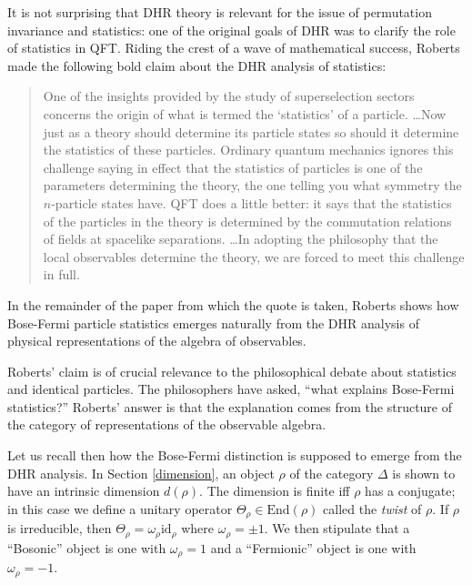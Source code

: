 \documentclass[11pt]{article}
\theoremstyle{definition}
\theoremstyle{definition}
\theoremstyle{remark}
\def\om{\omega} \def\Om{\Omega} \def\dd{\partial} \def\D{\Delta}
\newcommand{\End}{\mathrm{End}}
\def\id{\mathrm{id}}
\begin{document}
It is not surprising that DHR theory is relevant for the issue of
permutation invariance and statistics: one of the original goals of
DHR was to clarify the role of statistics in QFT.  Riding the crest of
a wave of mathematical success, Roberts made the following bold claim
about the DHR analysis of statistics:
\begin{quote}
  One of the insights provided by the study of
  superselection sectors concerns the origin of what is
  termed the `statistics' of a particle. \dots Now just
  as a theory should determine its particle states so
  should it determine the statistics of these
  particles.  Ordinary quantum mechanics ignores this
  challenge saying in effect that the statistics of
  particles is one of the parameters determining the
  theory, the one telling you what symmetry the
  $n$-particle states have.  QFT does a little better:
  it says that the statistics of the particles in the
  theory is determined by the commutation relations of
  fields at spacelike separations.  \ldots In adopting
  the philosophy that the local observables determine
  the theory, we are forced to meet this challenge in
  full.  \cite[p.\ 203]{rob-stat}
\end{quote} In the remainder of the paper from which the quote is
taken, Roberts shows how Bose-Fermi particle statistics emerges
naturally from the DHR analysis of physical representations of the
algebra of observables.

Roberts' claim is of crucial relevance to the philosophical debate
about statistics and identical particles.  The philosophers have
asked, ``what explains Bose-Fermi statistics?''  Roberts' answer is
that the explanation comes from the structure of the category of
representations of the observable algebra.

Let us recall then how the Bose-Fermi distinction is supposed to
emerge from the DHR analysis.  In Section \ref{dimension}, an object
$\rho$ of the category $\D$ is shown to have an intrinsic dimension
$d(\rho )$.  The dimension is finite iff $\rho$ has a conjugate; in
this case we define a unitary operator $\Theta _\rho \in
\End (\rho )$ called the \emph{twist} of $\rho$.  If $\rho$ is
irreducible, then $\Theta _{\rho}=\om _\rho \id _{\rho}$ where $\om
_\rho =\pm 1$.  We then stipulate that a ``Bosonic'' object is one
with $\om _\rho =1$ and a ``Fermionic'' object is one with $\om _\rho
=-1$.  
\end{document}
